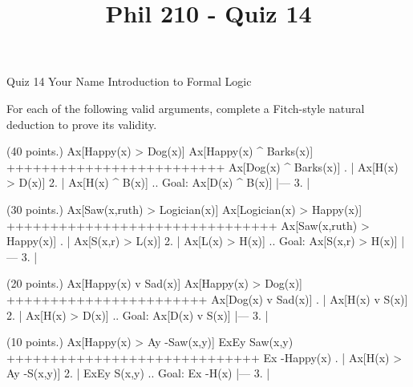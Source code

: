 
\title{Phil 210 - Quiz 14}

\heading
Quiz 14
Your Name
Introduction to Formal Logic
\endheading

For each of the following valid arguments, complete a Fitch-style natural deduction to prove its validity.

\quantifiers
\problems
{} (40 points.)
\argument
 Ax[Happy(x) > Dog(x)]
 Ax[Happy(x) ^ Barks(x)]
+++++++++++++++++++++++++
 Ax[Dog(x) ^ Barks(x)]
\endargument
        \answer
        . | Ax[H(x) > D(x)]
         2. | Ax[H(x) ^ B(x)]  ..  Goal: Ax[D(x) ^ B(x)]
            |---
         3. | 
        \endfitchproof
        \endanswer

 (30 points.)
\argument
 Ax[Saw(x,ruth) > Logician(x)]
 Ax[Logician(x) > Happy(x)]
+++++++++++++++++++++++++++++++
 Ax[Saw(x,ruth) > Happy(x)]
\endargument
        \answer
        . | Ax[S(x,r) > L(x)]
         2. | Ax[L(x) > H(x)]        ..  Goal: Ax[S(x,r) > H(x)]
            |---
         3. | 
        \endfitchproof
        \endanswer

 (20 points.)
\argument
 Ax[Happy(x) v Sad(x)]
 Ax[Happy(x) > Dog(x)]
+++++++++++++++++++++++
 Ax[Dog(x) v Sad(x)]
\endargument
        \answer
        . | Ax[H(x) v S(x)]
         2. | Ax[H(x) > D(x)]      ..  Goal: Ax[D(x) v S(x)]
            |---
         3. | 
        \endfitchproof
        \endanswer

 (10 points.)
\argument
 Ax[Happy(x) > Ay -Saw(x,y)]
 ExEy Saw(x,y)
+++++++++++++++++++++++++++++
 Ex -Happy(x)
\endargument
        \answer
        . | Ax[H(x) > Ay -S(x,y)]
         2. | ExEy S(x,y)                    ..  Goal: Ex -H(x)
            |---
         3. | 
        \endfitchproof
        \endanswer

\endproblems
\bye
